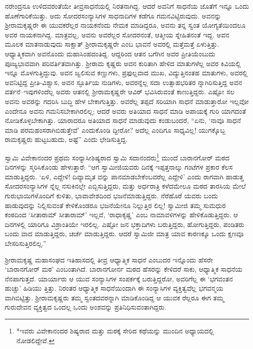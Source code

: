 ನರೇಂದ್ರನೂ ಉಳಿದವರಂತೆಯೇ ತೀವ್ರಸಾಧನೆಯಲ್ಲಿ ನಿರತನಾಗಿದ್ದ. ಆದರೆ ಅವನಿಗೆ ಸಾಧನೆಯ ಜೊತೆಗೆ ಇನ್ನೂ ಒಂದು ಹೊಣೆಗಾರಿಕೆಯಿತ್ತು. ಅದು ಸೋದರಸಂನ್ಯಾಸಿಗಳ ಸಾಧನಾದಿಗಳ ಕಡೆಗೂ ಗಮನವಿಟ್ಟಿರುವುದು. ಅವನನ್ನು ಶ್ರೀರಾಮಕೃಷ್ಣರೇ ಈ ಯುವಕರೆಲ್ಲರ ನಾಯಕನೆಂದು ನೇಮಕ ಮಾಡಿದ್ದರೂ, ಅವನು ತನ್ನ ಸ್ವಂತ ಯೋಗ್ಯತೆಯಿಂದಲೂ ಅವರ ನಾಯಕನಾಗಿದ್ದ. ಮಾತ್ರವಲ್ಲ, ಅವನು ಅವರೆಲ್ಲರ ಸೋದರನಂತೆ, ಆತ್ಮೀಯ ಸ್ನೇಹಿತನಂತೆ ಇದ್ದ. ಅವನ ಮೂಲಕ ಮಾತನಾಡುವುದು ಸಾಕ್ಷಾತ್ ಶ್ರೀರಾಮಕೃಷ್ಣರೇ ಎಂಬ ಭಾವನೆ ಅವರಲ್ಲಿ ಮತ್ತೆಮತ್ತೆ ಏಳುತ್ತಿತ್ತು. ಆಧ್ಯಾತ್ಮಿಕವಾಗಿ ಅವನೊಂದು ಮಹಾಸಿಂಹದಂತಿದ್ದ. ಆದ್ದರಿಂದ ಆತನ ಬಗೆಗಿನ ಅವರ ಪ್ರೀತಿಯೆಂಬುದು ಪೂಜ್ಯಭಾವವಾಗಿ ಪರಿವರ್ತಿತವಾಗಿತ್ತು. ಶ್ರೀರಾಮ ಕೃಷ್ಣರು ಅವನ ಕುರಿತಾಗಿ ಹೇಳಿದ ಮಾತುಗಳೆಲ್ಲ ಅವರ ಕಿವಿಯಲ್ಲಿ ಇನ್ನೂ ಮೊಳಗುತ್ತಿದ್ದುವು. ಅವನ ಜ್ವಲಿಸುವ ಕಣ್ಣುಗಳು, ಪ್ರಫುಲ್ಲವಾದ ಮುಖ, ವಿದ್ಯುತ್ತಿನಂತಹ ಮಾತುಗಳು, ಅವರಲ್ಲಿ ಅವನಿಟ್ಟಿದ್ದ ಪ್ರೀತಿ-ವಿಶ್ವಾಸ, ಅವನ ಸ್ಫೂರ್ತಿಯ ನುಡಿಗಳು, ಅವರನ್ನೆಲ್ಲ ಸದಾ ಉತ್ಸಾಹಭರಿತರ ನ್ನಾಗಿರಿಸುತ್ತಿದ್ದ ಅವನ ವರ್ತನೆ–ಇವುಗಳಿಂದೆಲ್ಲ ಅವರು ಆತನಲ್ಲಿ ಶ್ರೀರಾಮಕೃಷ್ಣರೇ ಆವಿರ್ ಭವಿಸಿರುವಂತೆ ಕಾಣುತ್ತಿದ್ದರು. ಎಷ್ಟೋ ಸಲ ಅವನು ಅವರನ್ನು ಗದರಿಸಿ ಬುದ್ಧಿ ಹೇಳ ಬೇಕಾಗುತ್ತಿತ್ತು. ಅವರೆಲ್ಲ ತಪ್ಪದೆ ಸರಿಯಾಗಿ ಸಾಧನೆ ಮಾಡುತ್ತಾರೋ ಇಲ್ಲವೋ ಎಂದೇನೂ ಅವನು ಗಮನಿಸಬೇಕಾಗಿರಲಿಲ್ಲ; ಆದರೆ ಅವರು ಅತಿಯಾದ ಸಾಧನೆ ಮಾಡಿ ಅಪಾಯಕ್ಕೆ ಗುರಿ ಯಾಗದಂತೆ ನೋಡಿಕೊಳ್ಳಬೇಕಾಗಿತ್ತು. ಯಾರಾದರೂ ಅತಿಯಾದ ಸಾಧನೆ ಮಾಡುವುದು ಕಂಡುಬಂದರೆ, “ಏನು, ‘ನಾವೂ ಸಾಧನೆ ಮಾಡಿ ಪರಮಹಂಸರಾಗಿಬಿಡುತ್ತೇವೆ’ ಎಂದುಕೊಂಡಿ ದ್ದೀರೋ? ಅದೆಲ್ಲ ಎಂದಿಗೂ ಸಾಧ್ಯವಿಲ್ಲ! ಯುಗಕ್ಕೊಬ್ಬ ರಾಮಕೃಷ್ಣರು ಹುಟ್ಟಬಹುದು, ಅಷ್ಟೆ” ಎಂದು ಛೇಡಿಸುತ್ತಿದ್ದ.

ಸ್ವಾಮಿ ವಿವೇಕಾನಂದರ ಪ್ರಥಮ ಸಂನ್ಯಾಸೀಶಿಷ್ಯರಾದ ಸ್ವಾಮಿ ಸದಾನಂದರು\footnote{*ಇವರು ವಿವೇಕಾನಂದರ ಶಿಷ್ಯರಾದ ಮತ್ತು ಮಠಕ್ಕೆ ಸೇರಿದ ಕಥೆಯನ್ನು ಮುಂದಿನ ಅಧ್ಯಾಯದಲ್ಲಿ ನೋಡಲಿದ್ದೇವೆ.} ಮುಂದೆ ಬಾರಾನಗೋರ್ ಮಠದ ದಿನಗಳನ್ನು ಸ್ಮರಿಸಿಕೊಂಡು ಹೇಳುತ್ತಾರೆ: “ಆಗ ಸ್ವಾಮೀಜಿಯವರು ದಿನಕ್ಕೆ ಇಪ್ಪತ್ತನಾಲ್ಕು ಗಂಟೆಗಳ ಪ್ರಕಾರ ಕೆಲಸ ಮಾಡುತ್ತಿದ್ದರು. ‘ಏಳಿ, ಎದ್ದೇಳಿ! ದಿವ್ಯಾಮೃತ ವನ್ನು ಪಾನಮಾಡಬೇಕೆಂಬವರೆಲ್ಲ ಎದ್ದೇಳಿ’ ಎಂದು ರಾಗವಾಗಿ ಹಾಡುತ್ತ ಸೋದರಸಂನ್ಯಾಸಿಗಳ ನ್ನೆಲ್ಲ ನಸುಕಿನಲ್ಲೇ ಎಬ್ಬಿಸುತ್ತಿದ್ದರು, ಮತ್ತು ಅರ್ಧರಾತ್ರಿ ಕಳೆದಮೇಲೂ ಮಠದ ತಾರಸಿಯ ಮೇಲೆ ಗುರುಭಾಯಿಗಳೊಂದಿಗೆ ಕುಳಿತು, ಭಾವಾವೇಶದಿಂದ ಭಜನೆಮಾಡುತ್ತಿದ್ದರು. ನೆರೆಹೊರೆ ಯವರು ಬಂದು ಹಾಡುವುದನ್ನು ನಿಲ್ಲಿಸುವಂತೆ ಕೇಳಿಕೊಂಡರೂ ಭಜನೆಯೇನೂ ನಿಲ್ಲುತ್ತಿರ ಲಿಲ್ಲ! ಸ್ವಾಮೀಜಿ ತಮ್ಮ ಸುಮಧುರ ಕಂಠದಿಂದ ‘ಸೀತಾರಾಮ್ ಸೀತಾರಾಮ್’ ಇಲ್ಲವೆ, ‘ರಾಧಾಕೃಷ್ಣ’ ಎಂಬ ನಾಮಾವಳಿಗಳನ್ನು ಹೇಳಿಕೊಡುತ್ತಿದ್ದರು. ಆ ದಿನಗಳಲ್ಲಿ ಯಾರಿಗೂ ವಿಶ್ರಾಂತಿಯೇ ಇರಲಿಲ್ಲ. ಎಷ್ಟೋ ಜನ ಭಕ್ತಾದಿಗಳು ಬರುತ್ತಿದ್ದರು, ಹೋಗುತ್ತಿದ್ದರು, ಪಂಡಿತರು ಬಂದು ವಾದ ಮಾಡುತ್ತಿದ್ದರು, ಚರ್ಚೆ ಮಾಡುತ್ತಿದ್ದರು. ಆದರೆ ಸ್ವಾಮಿಜೀ ಮಾತ್ರ ಯಾವ ಕಾರಣಕ್ಕೂ ಒಂದು ಕ್ಷಣವೂ ಬೇಸರಿಸುತ್ತಿರಲಿಲ್ಲ.”

ಶ್ರೀರಾಮಕೃಷ್ಣ ಮಹಾಸಂಘದ ಇತಿಹಾಸದಲ್ಲಿ ತೀವ್ರ ಆಧ್ಯಾತ್ಮಿಕ ಸಾಧನೆ ಎಂಬುದರ ಇನ್ನೊಂದು ಹೆಸರೇ ‘ಬಾರಾನಗೋರ್ ಮಠ’ ಎಂಬಂತಾಗಿದೆ. ಬಾರಾನಗೋರ್ನ ಮಠದ ಹೆಸರನ್ನು ಕೇಳಿದರೆ ಸಾಕು, ಆಧ್ಯಾತ್ಮಿಕ ಸಾಧನೆಯ ನೆನಪಾಗುತ್ತದೆ. ಯಾರ್ಯಾರು ಆ ಯುವ ಸಂನ್ಯಾಸಿಗಳ ಸಂಪರ್ಕಕ್ಕೆ ಬರುತ್ತಿದ್ದರೋ, ಅವರಿಗೆಲ್ಲ ಈ ‘ಭಗವಂತನ ಹುಚ್ಚು’ ಹಿಡಿಯು ತ್ತಿತ್ತು. ನಿರಂತರ ಆಧ್ಯಾತ್ಮಿಕ ಸಾಧನೆಯಿಂದಾಗಿ ಈ ಸಂನ್ಯಾಸಿಗಳ ವ್ಯಕ್ತಿತ್ವವೆಲ್ಲ ಭಗವನ್ಮಯ ವಾಗಿಬಿಟ್ಟಿತ್ತು. ಶ್ರೀರಾಮಕೃಷ್ಣರು ತಮ್ಮ ಸ್ವಂತದವರನ್ನಾಗಿ ಮಾಡಿಕೊಂಡಿದ್ದ ಆ ಯುವಕ ರೆಲ್ಲರೂ ಈಗ ತಮ್ಮ ಗುರುದೇವನ ವ್ಯಕ್ತಿತ್ವದ ಒಂದಲ್ಲ ಒಂದು ಅಂಶವನ್ನು ಪ್ರತಿನಿಧಿಸುವಂತಾಗಿದ್ದರು.

